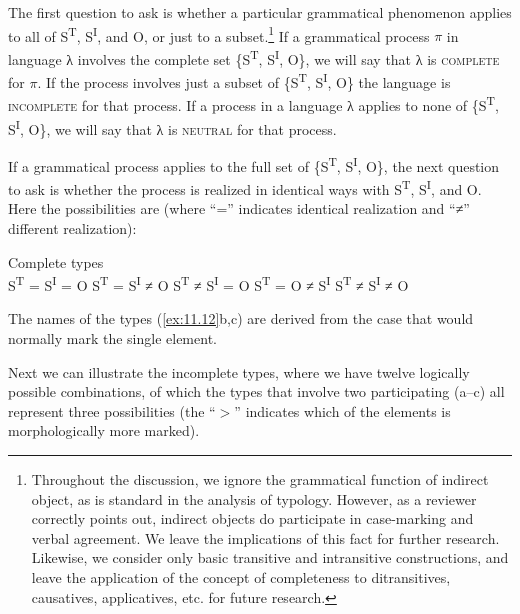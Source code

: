 \documentclass[output=paper]{langsci/langscibook}
\begin{document}
The first question to ask is whether a particular grammatical phenomenon
applies to all of S\textsuperscript{T}, S\textsuperscript{I}, and O, or just to
a subset.\footnote{Throughout the discussion, we ignore the grammatical
    function of indirect object, as is standard in the analysis of 
    typology. However, as a reviewer correctly points out, indirect objects do
    participate in case-marking and verbal agreement. We leave the implications
    of this fact for further research. Likewise, we consider only basic
    transitive and intransitive constructions, and leave the application of the
concept of completeness to ditransitives, causatives, applicatives, etc. for
future research.} If a grammatical process $\pi $ in language λ involves the
complete set \{S\textsuperscript{T}, S\textsuperscript{I}, O\}, we will say
that λ is \textsc{complete} for $\pi$. If the process involves just a subset of
\{S\textsuperscript{T}, S\textsuperscript{I}, O\} the language is
\textsc{incomplete} for that process. If a process in a language λ applies to
none of \{S\textsuperscript{T}, S\textsuperscript{I}, O\}, we will say that λ
is \textsc{neutral} for that process.

If a grammatical process applies to the full set of \{S\textsuperscript{T},
S\textsuperscript{I}, O\}, the next question to ask is whether the process is
realized in identical ways with S\textsuperscript{T}, S\textsuperscript{I}, and
O. Here the possibilities are (where \enquote{=} indicates identical
realization and \enquote{≠} different realization):

\ea%
    \label{ex:11.12}Complete types\\
	\ea S\textsuperscript{T} = S\textsuperscript{I} = O 
	\ex S\textsuperscript{T} = S\textsuperscript{I} ≠ O 
	\ex S\textsuperscript{T} ≠ S\textsuperscript{I} = O 
	\ex S\textsuperscript{T} = O ≠ S\textsuperscript{I} 
	\ex S\textsuperscript{T} ≠ S\textsuperscript{I} ≠ O 
	\z
\z

The names of the types (\ref{ex:11.12}b,c) are derived from the case that
would normally mark the single element.

Next we can illustrate the incomplete  types, where we have twelve
logically possible combinations, of which the types that involve two
participating  (a--c) all represent three possibilities
(the \enquote{$>$} indicates which of the elements is morphologically more
marked).
\end{document}

